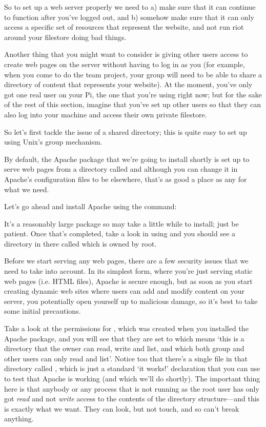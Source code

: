 So to set up a web server properly we need to a) make sure that it can continue to function after you've logged out, and b) somehow make sure that it can only access a specific set of resources that represent the website, and not run riot around your filestore doing bad things. 

Another thing that you might want to consider is giving other users access to create web pages on the server without having to log in as you (for example, when you come to do the team project, your group will need to be able to share a directory of content that represents your website). At the moment, you've only got one real user on your Pi, the one that you're using right now; but for the sake of the rest of this section, imagine that you've set up other users so that they can also log into your machine and access their own private filestore. 

So let's first tackle the issue of a shared directory; this is quite easy to set up using Unix's group mechanism. 

By default, the Apache package that we're going to install shortly is set up to serve web pages from a directory called  and although you can change it in Apache's configuration files to be elsewhere, that's as good a place as any for what we need. 

Let's go ahead and install Apache using the command:


It's a reasonably large package so may take a little while to install; just be patient. Once that's completed, take a look in  using  and you should see a directory in there called  which is owned by root.

Before we start serving any web pages, there are a few security issues that we need to take into account. In its simplest form, where you're just serving static web pages (i.e. HTML files), Apache is secure enough, but as soon as you start creating dynamic web sites where users can add and modify content on your server, you potentially open yourself up to malicious damage, so it's best to take some initial precautions. 

Take a look at the permissions for , which was created when you installed the Apache package, and you will see that they are set to  which means `this is a directory that the owner can read, write and list, and which both group and other users can only read and list'. Notice too that there's a single file in that directory called , which is just a standard `it works!' declaration that you can use to test that Apache is working (and which we'll do shortly). The important thing here is that anybody or any process that is not running as the root user has only got \textit{read} and not \textit{write} access to the contents of the  directory structure---and this is exactly what we want. They can look, but not touch, and so can't break anything. 

